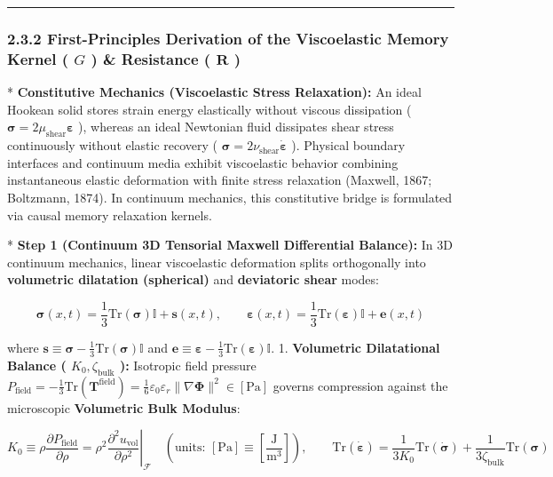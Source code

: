\documentclass[11pt,a4paper]{article}
\theoremstyle{definition}\newtheorem{definition}{Definition}
\theoremstyle{remark}\newtheorem{remark}{Remark}
\begin{document}
\noindent\rule{\linewidth}{0.4pt}
\subsubsection{2.3.2 First-Principles Derivation of the Viscoelastic Memory Kernel ( $G$ ) \& Resistance ( $\mathbf{R}$ )}

* \textbf{Constitutive Mechanics (Viscoelastic Stress Relaxation):} An ideal Hookean solid stores strain energy elastically without viscous dissipation ( $\boldsymbol{\sigma} = 2\mu_{\text{shear}} \boldsymbol{\varepsilon}$ ), whereas an ideal Newtonian fluid dissipates shear stress continuously without elastic recovery ( $\boldsymbol{\sigma} = 2\nu_{\text{shear}} \dot{\boldsymbol{\varepsilon}}$ ). Physical boundary interfaces and continuum media exhibit viscoelastic behavior combining instantaneous elastic deformation with finite stress relaxation (Maxwell, 1867; Boltzmann, 1874). In continuum mechanics, this constitutive bridge is formulated via causal memory relaxation kernels.

* \textbf{Step 1 (Continuum 3D Tensorial Maxwell Differential Balance):}
In 3D continuum mechanics, linear viscoelastic deformation splits orthogonally into \textbf{volumetric dilatation (spherical)} and \textbf{deviatoric shear} modes:


\begin{equation}
\boldsymbol{\sigma}(x, t) = \frac{1}{3}\mathrm{Tr}(\boldsymbol{\sigma})\mathbb{I} + \mathbf{s}(x, t), \qquad \boldsymbol{\varepsilon}(x, t) = \frac{1}{3}\mathrm{Tr}(\boldsymbol{\varepsilon})\mathbb{I} + \mathbf{e}(x, t)
\end{equation}


where $\mathbf{s} \equiv \boldsymbol{\sigma} - \frac{1}{3}\mathrm{Tr}(\boldsymbol{\sigma})\mathbb{I}$ and $\mathbf{e} \equiv \boldsymbol{\varepsilon} - \frac{1}{3}\mathrm{Tr}(\boldsymbol{\varepsilon})\mathbb{I}$.
1. \textbf{Volumetric Dilatational Balance ( $K_0, \zeta_{\text{bulk}}$ ):}
Isotropic field pressure $P_{\text{field}} = -\frac{1}{3}\mathrm{Tr}(\mathbf{T}^{\text{field}}) = \frac{1}{6}\varepsilon_0 \varepsilon_r \|\nabla \mathbf{\Phi}\|^2 \in [\mathrm{Pa}]$ governs compression against the microscopic \textbf{Volumetric Bulk Modulus}:


\begin{equation}
\boxed{K_0 \equiv \rho \frac{\partial P_{\text{field}}}{\partial \rho} = \rho^2 \left.\frac{\partial^2 u_{\text{vol}}}{\partial \rho^2}\right|_{\mathcal{F}} \quad \left( \text{units: } [\mathrm{Pa}] \equiv [\frac{\mathrm{J}}{\mathrm{m^3}}] \right), \qquad \mathrm{Tr}(\dot{\boldsymbol{\varepsilon}}) = \frac{1}{3 K_0} \mathrm{Tr}(\dot{\boldsymbol{\sigma}}) + \frac{1}{3 \zeta_{\text{bulk}}} \mathrm{Tr}(\boldsymbol{\sigma})}
\end{equation}
\end{document}

